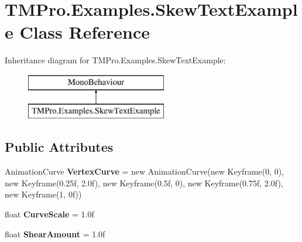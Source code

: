 \hypertarget{class_t_m_pro_1_1_examples_1_1_skew_text_example}{}\section{T\+M\+Pro.\+Examples.\+Skew\+Text\+Example Class Reference}
\label{class_t_m_pro_1_1_examples_1_1_skew_text_example}
Inheritance diagram for T\+M\+Pro.\+Examples.\+Skew\+Text\+Example\+:\begin{figure}[H]
\begin{center}
\leavevmode
\includegraphics[height=2.000000cm]{class_t_m_pro_1_1_examples_1_1_skew_text_example}
\end{center}
\end{figure}
\subsection*{Public Attributes}
\begin{DoxyCompactItemize}
\item 
\mbox{\label{class_t_m_pro_1_1_examples_1_1_skew_text_example_a97a9859d8cdc12282e8bab29234cdf40}} 
Animation\+Curve {\bfseries Vertex\+Curve} = new Animation\+Curve(new Keyframe(0, 0), new Keyframe(0.\+25f, 2.\+0f), new Keyframe(0.\+5f, 0), new Keyframe(0.\+75f, 2.\+0f), new Keyframe(1, 0f))
\item 
\mbox{\label{class_t_m_pro_1_1_examples_1_1_skew_text_example_a99a24dc0d0b4c3c9ae46c925a57031f1}} 
float {\bfseries Curve\+Scale} = 1.\+0f
\item 
\mbox{\label{class_t_m_pro_1_1_examples_1_1_skew_text_example_a6f76ea16465a528676168b897d3d90a2}} 
float {\bfseries Shear\+Amount} = 1.\+0f
\end{DoxyCompactItemize}
